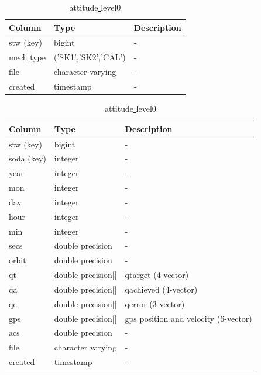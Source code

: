 \documentclass[12pt]{article}
\begin{document}
\begin{table}
\begin{tiny}
\begin{subtable}{.9\linewidth}
    \end{subtable}%
\newline
\newline

    \begin{subtable}{.9\linewidth}
      \centering
       \captionsetup{font=scriptsize}
        \label{table:fba0}
\caption{fba\underline{ }level0}
\begin{tabular}{l l l}
\hline
\hline
Column & Type & Description \\ [0.5ex]
\hline
stw (key) & bigint & - \\
mech\underline{ }type & ('SK1','SK2','CAL') & -\\
file                      & character varying                  & -\\
created                        & timestamp                   & -\\[1ex]
\hline
\end{tabular}
    \end{subtable} 
 \newline
\newline

\begin{subtable}{.9\linewidth}
      \centering
       \captionsetup{font=scriptsize}
       \label{table:att0}
\caption{attitude\underline{ }level0}
\begin{tabular}{l l l}
\hline
\hline
Column & Type & Description \\ [0.5ex]
\hline
stw (key) & bigint             & - \\
soda (key) & integer             & - \\
year     & integer            & -\\
mon     & integer            & -\\
day     & integer            & -\\
hour    & integer            & -\\
min     & integer            & -\\
secs    & double precision   & -\\
orbit   & double precision   & -\\ 
qt      & double precision[] & qtarget (4-vector)\\
qa      & double precision[] & qachieved (4-vector)\\
qe      & double precision[] & qerror (3-vector)\\
gps     & double precision[] & gps position and velocity (6-vector)\\
acs     & double precision   & -\\
file                      & character varying                   & -\\
created                        & timestamp                   & -\\[1ex]
\hline
\end{tabular}
    \end{subtable}
\newline
\newline


\end{tiny}
\end{table}
\end{document}
